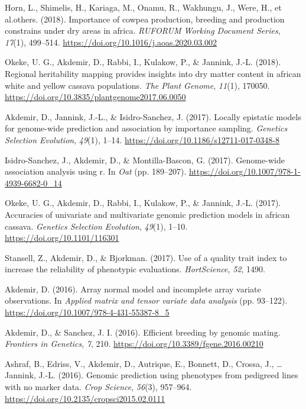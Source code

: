 \documentclass[11pt,a4paper,]{moderncv}
\newlength{\cslhangindent}
\newenvironment{CSLReferences}[2] %
 {\begin{list}{}{%
  \setlength{\itemindent}{0pt}
  \setlength{\leftmargin}{0pt}
  \setlength{\parsep}{0pt}
  \ifodd #1
   \setlength{\leftmargin}{\cslhangindent}
   \setlength{\itemindent}{-1\cslhangindent}
  \fi
  \setlength{\itemsep}{#2\baselineskip}}}
 {\end{list}}
\begin{document}
\begin{CSLReferences}{1}{0}
Horn, L., Shimelis, H., Kariaga, M., Onamu, R., Wakhungu, J., Were, H.,
et al.others. (2018). Importance of cowpea production, breeding and
production constrains under dry areas in africa. \emph{RUFORUM Working
Document Series}, \emph{17}(1), 499--514.
\url{https://doi.org/10.1016/j.aoas.2020.03.002}

Okeke, U. G., Akdemir, D., Rabbi, I., Kulakow, P., \& Jannink, J.-L.
(2018). Regional heritability mapping provides insights into dry matter
content in african white and yellow cassava populations. \emph{The Plant
Genome}, \emph{11}(1), 170050.
\url{https://doi.org/10.3835/plantgenome2017.06.0050}

Akdemir, D., Jannink, J.-L., \& Isidro-Sanchez, J. (2017). Locally
epistatic models for genome-wide prediction and association by
importance sampling. \emph{Genetics Selection Evolution}, \emph{49}(1),
1--14. \url{https://doi.org/10.1186/s12711-017-0348-8}

Isidro-Sanchez, J., Akdemir, D., \& Montilla-Bascon, G. (2017).
Genome-wide association analysis using r. In \emph{Oat} (pp. 189--207).
\url{https://doi.org/10.1007/978-1-4939-6682-0_14}

Okeke, U. G., Akdemir, D., Rabbi, I., Kulakow, P., \& Jannink, J.-L.
(2017). Accuracies of univariate and multivariate genomic prediction
models in african cassava. \emph{Genetics Selection Evolution},
\emph{49}(1), 1--10. \url{https://doi.org/10.1101/116301}

Stansell, Z., Akdemir, D., \& Bjorkman. (2017). Use of a quality trait
index to increase the reliability of phenotypic evaluations.
\emph{HortScience}, \emph{52}, 1490.

Akdemir, D. (2016). Array normal model and incomplete array variate
observations. In \emph{Applied matrix and tensor variate data analysis}
(pp. 93--122). \url{https://doi.org/10.1007/978-4-431-55387-8_5}

Akdemir, D., \& Sanchez, J. I. (2016). Efficient breeding by genomic
mating. \emph{Frontiers in Genetics}, \emph{7}, 210.
\url{https://doi.org/10.3389/fgene.2016.00210}

Ashraf, B., Edriss, V., Akdemir, D., Autrique, E., Bonnett, D., Crossa,
J., \ldots{} Jannink, J.-L. (2016). Genomic prediction using phenotypes
from pedigreed lines with no marker data. \emph{Crop Science},
\emph{56}(3), 957--964.
\url{https://doi.org/10.2135/cropsci2015.02.0111}


\end{CSLReferences}
\end{document}
